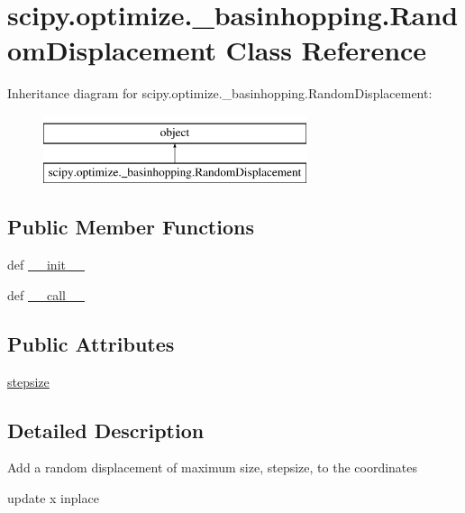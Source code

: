 \hypertarget{classscipy_1_1optimize_1_1__basinhopping_1_1RandomDisplacement}{}\section{scipy.\+optimize.\+\_\+basinhopping.\+Random\+Displacement Class Reference}
\label{classscipy_1_1optimize_1_1__basinhopping_1_1RandomDisplacement}
Inheritance diagram for scipy.\+optimize.\+\_\+basinhopping.\+Random\+Displacement\+:\begin{figure}[H]
\begin{center}
\leavevmode
\includegraphics[height=2.000000cm]{classscipy_1_1optimize_1_1__basinhopping_1_1RandomDisplacement}
\end{center}
\end{figure}
\subsection*{Public Member Functions}
\begin{DoxyCompactItemize}
\item 
def \hyperlink{classscipy_1_1optimize_1_1__basinhopping_1_1RandomDisplacement_afd7205e3da46a00baff78e4d27b0c17f}{\+\_\+\+\_\+init\+\_\+\+\_\+}
\item 
def \hyperlink{classscipy_1_1optimize_1_1__basinhopping_1_1RandomDisplacement_aee042989f954e13039a1c73d8522b0dd}{\+\_\+\+\_\+call\+\_\+\+\_\+}
\end{DoxyCompactItemize}
\subsection*{Public Attributes}
\begin{DoxyCompactItemize}
\item 
\hyperlink{classscipy_1_1optimize_1_1__basinhopping_1_1RandomDisplacement_a7a95c352140dd181c4ab950217134ffe}{stepsize}
\end{DoxyCompactItemize}


\subsection{Detailed Description}
\begin{DoxyVerb}Add a random displacement of maximum size, stepsize, to the coordinates

update x inplace
\end{DoxyVerb}
 

